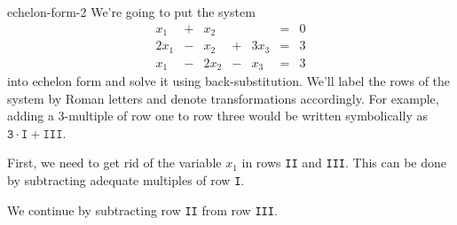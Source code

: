 \begin{example}{}{echelon-form-2}
 We're going to put the system
 \[
  \begin{array}{rcrcrcr}
    x_1 & + & x_2 & & & = & 0\\
    2x_1 & - & x_2 & + & 3x_3 & = & 3\\
    x_1 & - & 2x_2 & - & x_3 & = & 3
  \end{array}
 \]
 into echelon form and solve it using back-substitution. We'll label the rows of
 the system by Roman letters and denote transformations accordingly. For
 example, adding a $3$-multiple of row one to row three would be written
 symbolically as $\mathtt{3 \cdot I + III}$.

 First, we need to get rid of the variable $x_1$ in rows \texttt{II} and
 \texttt{III}. This can be done by subtracting adequate multiples of row
 \texttt{I}.
 \begin{center}
 \end{center}
 We continue by subtracting row \texttt{II} from row \texttt{III}.
 \begin{center}
\end{center}
\end{example}
